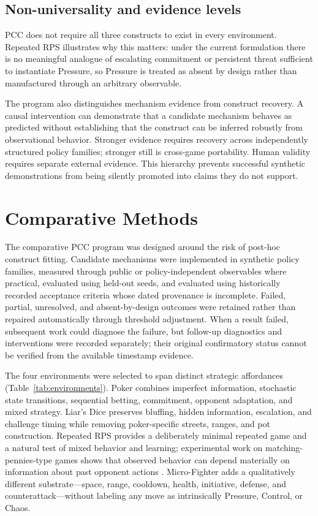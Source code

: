 \documentclass[journal]{IEEEtran}
\begin{document}
\subsection{Non-universality and evidence levels}

PCC does not require all three constructs to exist in every environment. Repeated RPS illustrates why this matters: under the current formulation there is no meaningful analogue of escalating commitment or persistent threat sufficient to instantiate Pressure, so Pressure is treated as absent by design rather than manufactured through an arbitrary observable.

The program also distinguishes mechanism evidence from construct recovery. A causal intervention can demonstrate that a candidate mechanism behaves as predicted without establishing that the construct can be inferred robustly from observational behavior. Stronger evidence requires recovery across independently structured policy families; stronger still is cross-game portability. Human validity requires separate external evidence. This hierarchy prevents successful synthetic demonstrations from being silently promoted into claims they do not support.

\section{Comparative Methods}
\label{sec:methods}

The comparative PCC program was designed around the risk of post-hoc construct fitting. Candidate mechanisms were implemented in synthetic policy families, measured through public or policy-independent observables where practical, evaluated using held-out seeds, and evaluated using historically recorded acceptance criteria whose dated provenance is incomplete. Failed, partial, unresolved, and absent-by-design outcomes were retained rather than repaired automatically through threshold adjustment. When a result failed, subsequent work could diagnose the failure, but follow-up diagnostics and interventions were recorded separately; their original confirmatory status cannot be verified from the available timestamp evidence.

The four environments were selected to span distinct strategic affordances (Table~\ref{tab:environments}). Poker combines imperfect information, stochastic state transitions, sequential betting, commitment, opponent adaptation, and mixed strategy. Liar's Dice preserves bluffing, hidden information, escalation, and challenge timing while removing poker-specific streets, ranges, and pot construction. Repeated RPS provides a deliberately minimal repeated game and a natural test of mixed behavior and learning; experimental work on matching-pennies-type games shows that observed behavior can depend materially on information about past opponent actions \cite{mookherjee1994}. Micro-Fighter adds a qualitatively different substrate---space, range, cooldown, health, initiative, defense, and counterattack---without labeling any move as intrinsically Pressure, Control, or Chaos.
\end{document}
